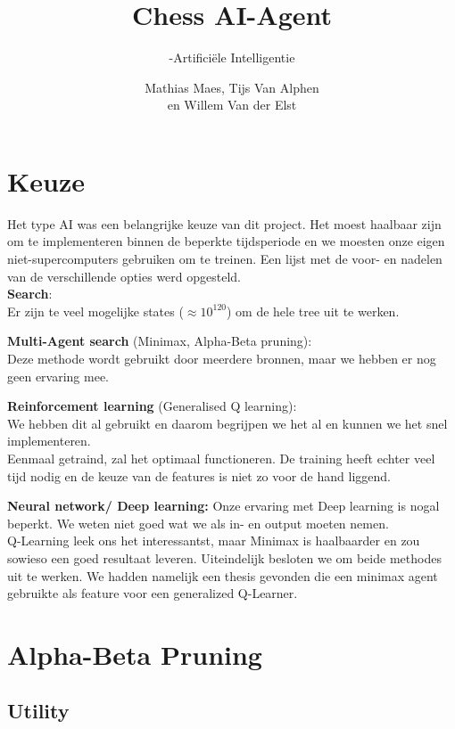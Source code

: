 \documentclass[a4paper,openany]{uantwerpenassignment}
\title{\sffamily Chess AI-Agent}
\subtitle{\sffamily5-Artificiële Intelligentie}
\author{\sffamily Mathias Maes, Tijs Van Alphen \\en Willem Van der Elst}
\begin{document}
\sffamily
\maketitle

\tableofcontents

\chapter{Keuze}

Het type AI was een belangrijke keuze van dit project. Het moest haalbaar zijn om te implementeren binnen de beperkte tijdsperiode en we moesten onze eigen niet-supercomputers gebruiken om te treinen. Een lijst  met de voor- en nadelen van de verschillende opties werd opgesteld.\\[2 \baselineskip]


\textbf{Search}:\\
Er zijn te veel mogelijke states ($\approx10^{120}$) om de hele tree uit te werken. 

\textbf{Multi-Agent search} (Minimax, Alpha-Beta pruning):\\
Deze methode wordt gebruikt door meerdere bronnen, maar we hebben er nog geen ervaring mee. 

\textbf{Reinforcement learning} (Generalised Q learning):\\
We hebben dit al gebruikt en daarom begrijpen we het al en kunnen we het snel implementeren.\\
Eenmaal getraind, zal het optimaal functioneren. De training heeft echter veel tijd nodig en de keuze van de features is niet zo voor de hand liggend.

\textbf{Neural network/ Deep learning:}
Onze ervaring met Deep learning is nogal beperkt. We weten niet goed wat we als in- en output moeten nemen. \\[2 \baselineskip]


Q-Learning leek ons het interessantst, maar Minimax is haalbaarder en zou sowieso een goed resultaat leveren. Uiteindelijk besloten we om beide methodes uit te werken. We hadden namelijk een thesis\cite{rl} gevonden die een minimax agent gebruikte als feature voor een generalized Q-Learner.

\chapter{Alpha-Beta Pruning}

\section{Utility}
\label{utility}
\end{document}
